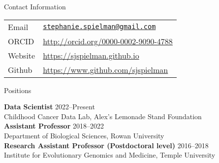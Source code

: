 \documentclass{resume} %
\begin{document}
\vspace*{0.5cm}
\begin{rSection}{Contact Information}
\vspace*{0.25cm}

\begin{table}[H]
	\begin{tabular}{ll}
		Email & \texttt{\href{mailto:stephanie.spielman@gmail.com}{stephanie.spielman@gmail.com}} \\
		ORCID & \url{http://orcid.org/0000-0002-9090-4788} \\
		Website & \url{https://sjspielman.github.io} \\
		Github &  \url{https://www.github.com/sjspielman} \\
	\end{tabular}
\end{table}
\end{rSection}
\vspace*{-0.45cm}



\begin{rSection}{Positions}
\vspace*{0.25cm}


\textbf{Data Scientist} \hfill {2022--Present} \\
Childhood Cancer Data Lab, Alex's Lemonade Stand Foundation \\


\textbf{Assistant Professor} \hfill {2018--2022} \\
Department of Biological Sciences, Rowan University \\


\textbf{Research Assistant Professor (Postdoctoral level)} \hfill {2016--2018} \\
Institute for Evolutionary Genomics and Medicine, Temple University \\
\end{rSection}
\end{document}

